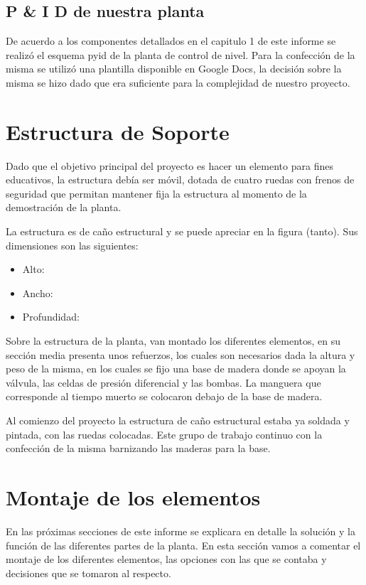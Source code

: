 \subsection{P \& I D de nuestra planta}
De acuerdo a los componentes detallados en el capitulo 1 de este informe se realizó el esquema \gls{pyid}
de la planta de control de nivel. Para la confección de la misma se utilizó una plantilla disponible
en Google Docs, la decisión sobre la misma se hizo dado que era suficiente para la complejidad de
nuestro proyecto.

\section{Estructura de Soporte}
\label{sec:EstructuraSoporte}

Dado que el objetivo principal del proyecto es hacer un elemento para fines educativos, la estructura
debía ser móvil, dotada de cuatro ruedas con frenos de seguridad que permitan mantener fija la estructura
al momento de la demostración de la planta.

La estructura es de caño estructural  y se puede apreciar en la figura
(tanto).
Sus dimensiones son las siguientes:

 \begin{itemize}
  \item Alto:
  \item Ancho:
  \item Profundidad:
 \end{itemize}
 Sobre la estructura de la planta, van montado los diferentes elementos, en su sección 
 media presenta unos refuerzos, los cuales son necesarios dada la altura y peso de la misma, en 
 los cuales se fijo una base de madera donde se apoyan la válvula, las celdas de presión diferencial
 y las bombas. La manguera que corresponde al tiempo muerto se colocaron debajo de la base de madera.
 
 Al comienzo del proyecto la estructura de caño estructural estaba ya soldada y pintada, con las ruedas
 colocadas. Este grupo de trabajo continuo con la confección de la misma barnizando las maderas para la
 base.
\section{Montaje de los elementos}
En las próximas secciones de este informe se explicara en detalle la solución y la función de las diferentes
partes de la planta. En esta sección vamos a comentar el montaje de los diferentes elementos, las 
opciones con las que se contaba y decisiones que se tomaron al respecto. 

